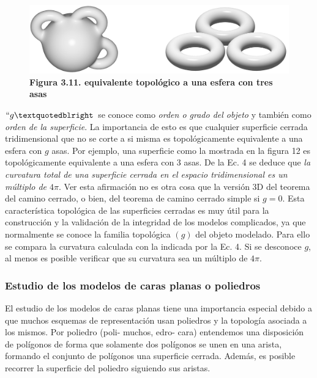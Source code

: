\begin{figure}[h]
\includegraphics[width=14cm]{Img/GEO/geo-toro.jpg}
\centering
\caption{\textbf{Figura 3.11. \footnotesize{equivalente topológico a una esfera con tres asas}}}
\end{figure}

$``g”$ se conoce como \textit{orden o grado del objeto} y también como \textit{orden de la superficie}.
La importancia de esto es que cualquier superficie cerrada tridimensional que no se corte a si misma es topológicamente equivalente a una esfera con $g$ asas. Por ejemplo, una superficie como la mostrada en la figura 12
es topológicamente equivalente a una esfera con 3 asas.
De la Ec. 4 se deduce que \textit{la curvatura total de una superficie cerrada
en el espacio tridimensional es un múltiplo de $4\pi$}. Ver esta afirmación no
es otra cosa que la versión 3D del teorema del camino cerrado, o bien, del
teorema de camino cerrado simple si $g = 0$. Esta característica topológica de
las superficies cerradas es muy útil para la construcción y la validación de la
integridad de los modelos complicados, ya que normalmente se conoce la familia topológica $(g)$ del objeto modelado. Para ello se compara la curvatura
calculada con la indicada por la Ec. 4. Si se desconoce $g$, al menos es posible
verificar que su curvatura sea un múltiplo de $4\pi$.


\subsubsection{ Estudio de los modelos de caras planas o poliedros }

El estudio de los modelos de caras planas tiene una importancia especial debido a que muchos esquemas de representación usan poliedros y la topología asociada a los mismos.
Por poliedro (poli- muchos, edro- cara) entendemos una disposición de polígonos de forma que solamente dos polígonos se unen en una arista, formando el conjunto de polígonos una superficie cerrada. Además, es posible recorrer la superficie del poliedro siguiendo sus aristas.

